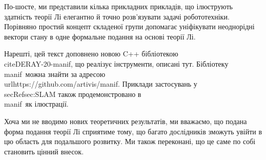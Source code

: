 По-шосте, ми представили кілька прикладних прикладів, що ілюструють здатність теорії Лі елегантно й точно розв'язувати задачі робототехніки.
Порівняно простий концепт складеної групи допомагає уніфікувати неоднорідні вектори стану в одне формальне подання на основі теорії Лі.

Нарешті, цей текст доповнено новою C++ бібліотекою 
\manif\, \\cite{DERAY-20-manif}, що реалізує інструменти, описані тут.
Бібліотеку \\manif\ 
можна знайти за адресою \\url{https://github.com/artivis/manif}.
Приклади застосувань у \\secRef{sec:SLAM} також продемонстровано в \\manif\ як ілюстрації.

Хоча ми не вводимо нових теоретичних результатів, ми вважаємо, що подана форма подання теорії Лі сприятиме тому, що багато дослідників зможуть увійти в цю область для подальшого розвитку.
Ми також переконані, що це саме по собі становить цінний внесок.


